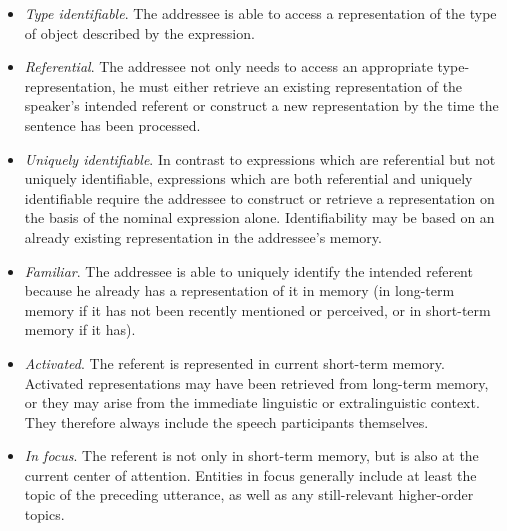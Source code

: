 \begin{itemize}
\item \textit{Type identifiable}. The addressee is able to access a representation of the type of object described by the expression.
\item \textit{Referential}. The addressee not only needs to access an appropriate type-representation, he must either retrieve an existing representation of the speaker's intended referent or construct a new representation by the time the sentence has been processed. 
\item\textit{Uniquely identifiable}. In contrast to expressions which are referential but not uniquely identifiable, expressions which are both referential and uniquely identifiable require the addressee to construct or retrieve a representation on the basis of the nominal expression alone. Identifiability may be based on an already existing representation in the addressee's memory. 
\item \textit{Familiar}. The addressee is able to uniquely identify the intended referent because he already has a representation of it in memory (in long-term memory if it has not been recently mentioned or perceived, or in short-term memory if it has). 
\item \textit{Activated}. The referent is represented in current short-term memory. Activated representations may have been retrieved from long-term memory, or they may arise from the immediate linguistic or extralinguistic context. They therefore always include the speech participants themselves.
\item \textit{In focus}. The referent is not only in short-term memory, but is also at the current center of attention. Entities in focus generally include at least the topic of the preceding utterance, as well as any still-relevant higher-order topics.
\end{itemize}
\z


